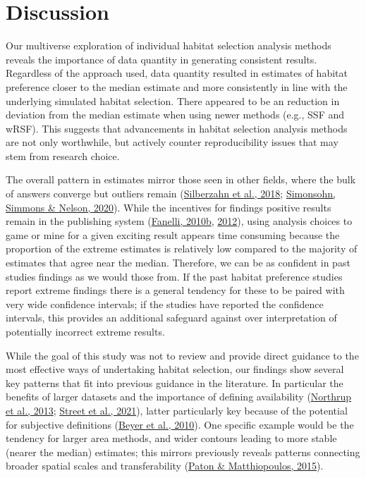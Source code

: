 \documentclass[10pt,a4paper]{article}
\begin{document}
\hypertarget{discussion}{%
\section{Discussion}\label{discussion}}

Our multiverse exploration of individual habitat selection analysis methods reveals the importance of data quantity in generating consistent results.
Regardless of the approach used, data quantity resulted in estimates of habitat preference closer to the median estimate and more consistently in line with the underlying simulated habitat selection.
There appeared to be an reduction in deviation from the median estimate when using newer methods (e.g., SSF and wRSF).
This suggests that advancements in habitat selection analysis methods are not only worthwhile, but actively counter reproducibility issues that may stem from research choice.

The overall pattern in estimates mirror those seen in other fields, where the bulk of answers converge but outliers remain (\protect\hyperlink{ref-silberzahn_many_2018}{Silberzahn et al., 2018}; \protect\hyperlink{ref-simonsohn_specification_2020}{Simonsohn, Simmons \& Nelson, 2020}).
While the incentives for findings positive results remain in the publishing system (\protect\hyperlink{ref-fanelli_positive_2010}{Fanelli, 2010b}, \protect\hyperlink{ref-fanelli_negative_2012}{2012}), using analysis choices to game or mine for a given exciting result appears time consuming because the proportion of the extreme estimates is relatively low compared to the majority of estimates that agree near the median.
Therefore, we can be as confident in past studies findings as we would those from.
If the past habitat preference studies report extreme findings there is a general tendency for these to be paired with very wide confidence intervals; if the studies have reported the confidence intervals, this provides an additional safeguard against over interpretation of potentially incorrect extreme results.

While the goal of this study was not to review and provide direct guidance to the most effective ways of undertaking habitat selection, our findings show several key patterns that fit into previous guidance in the literature.
In particular the benefits of larger datasets and the importance of defining availability (\protect\hyperlink{ref-northrup_practical_2013}{Northrup et al., 2013}; \protect\hyperlink{ref-street_solving_2021}{Street et al., 2021}), latter particularly key because of the potential for subjective definitions (\protect\hyperlink{ref-beyer_interpretation_2010}{Beyer et al., 2010}).
One specific example would be the tendency for larger area methods, and wider contours leading to more stable (nearer the median) estimates; this mirrors previously reveals patterns connecting broader spatial scales and transferability (\protect\hyperlink{ref-paton_defining_2015}{Paton \& Matthiopoulos, 2015}).
\end{document}
